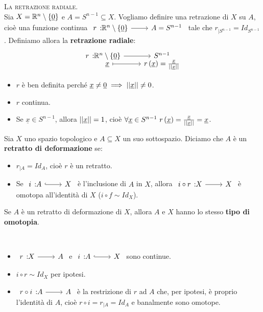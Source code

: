 \begin{example}\textsc{La retrazione radiale.}\label{retrazioneradiale}\\
	Sia $X=\mathbb{R}^n\setminus \left\{\underline{0}\right\}$ e $A=S^{n-1}\subseteq X$. Vogliamo definire una retrazione di $X$ su $A$, cioè una funzione continua $\funz{r}{\realset^n\setminus\left\{\underline{0}\right\}}{A=S^{n-1}}$ tale che $r_{\mid S^{n-1}}=Id_{S^{n-1}}$. Definiamo allora la \textbf{retrazione radiale}:
	\begin{equation}
		\funztot{r}{\realset^n\setminus\left\{\underline{0}\right\}}{S^{n-1}}{\underline{x}}{r\left(\underline{x}\right)=\frac{\underline{x}}{\labs \underline{x}\rabs}}
	\end{equation}
\begin{itemize}
	\item $r$ è ben definita perché $\underline{x}\neq\underline{0}\implies \left|\left| \underline{x}\right|\right|\neq 0$.
	\item $r$ continua.
	\item Se $\underline{x}\in S^{n-1}$, allora $\left|\left| \underline{x}\right|\right|=1$, cioè $\forall \underline{x}\in S^{n-1}\ r\left(\underline{x}\right)=\frac{\underline{x}}{\labs \underline{x}\rabs}=\underline{x}$.
\end{itemize}
\end{example}
\begin{define}
	Sia $X$ uno spazio topologico e $A\subseteq X$ un suo sottospazio. Diciamo che $A$ è un \textbf{retratto di deformazione} se:
		\begin{itemize}
			\item $r_{\mid A}=Id_A$, cioè $r$ è un retratto.
			\item Se $\incl{i}{A}{X}$ è l'inclusione di $A$ in $X$, allora $\funz{i\circ r}{X}{X}$ è omotopa all'identità di $X$ ($i\circ f\sim Id_X$).
		\end{itemize}
\end{define}
\begin{observe}
	Se $A$ è un retratto di deformazione di $X$, allora $A$ e $X$ hanno lo stesso \textbf{tipo di omotopia}.
\end{observe}
\begin{demonstration}~{}
	\begin{itemize}
		\item $\funz{r}{X}{A}$ e $\incl{i}{A}{X}$ sono continue.
		\item $i\circ r\sim Id_X$ per ipotesi.
		\item $\funz{r\circ i}{A}{A}$ è la restrizione di $r$ ad $A$ che, per ipotesi, è proprio l'identità di $A$, cioè $r\circ i=r_{\mid A}=Id_A$ e banalmente sono omotope.
	\end{itemize}
\end{demonstration}
